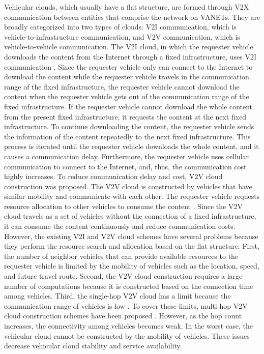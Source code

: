 \documentclass[sensors,article,accept,moreauthors,pdftex]{Definitions/mdpi}
\begin{document}
Vehicular clouds, which usually have a flat structure, are formed through V2X communication between entities that comprise the network on VANETs. They are broadly categorized into two types of clouds: V2I communication, which is vehicle-to-infrastructure communication, and V2V communication, which is vehicle-to-vehicle communication.
The V2I cloud, in which the requester vehicle downloads the content from the Internet through a fixed infrastructure, uses V2I communication \cite{Mershad2013, Lin2018, Yu2013, Abdelhamid2017, Jaiboon2017, Elahi2021, Rahman2018, Lee2019, Wang2020}. Since the requester vehicle only can connect to the Internet to download the content while the requester vehicle travels in the communication range of the fixed infrastructure, the requester vehicle cannot download the content when the requester vehicle gets out of the communication range of the fixed infrastructure. If the requester vehicle cannot download the whole content from the present fixed infrastructure, it requests the content at the next fixed infrastructure. To continue downloading the content, the requester vehicle sends the information of the content repeatedly to the next fixed infrastructure. This process is iterated until the requester vehicle downloads the whole content, and it causes a communication delay. Furthermore, the requester vehicle uses cellular communication to connect to the Internet, and, thus, the communication cost highly increases.
To reduce communication delay and cost, V2V cloud construction was proposed. The V2V cloud is constructed by vehicles that have similar mobility and communicate with each other. The requester vehicle requests resource allocation to other vehicles to consume the content \cite{Sibai2015, Meneguette2016, Meneguette2017a, Meneguette2017b, Meneguette2017c, Choi2018}. Since the V2V cloud travels as a set of vehicles without the connection of a fixed infrastructure, it can consume the content continuously and reduce communication costs.
However, the existing V2I and V2V cloud schemes have several problems because they perform the resource search and allocation based on the flat structure. First, the number of neighbor vehicles that can provide available resources to the requester vehicle is limited by the mobility of vehicles such as the location, speed, and future travel route. Second, the V2V cloud construction requires a large number of computations because it is constructed based on the connection time among vehicles. Third, the single-hop V2V cloud has a limit because the communication range of vehicles is low \cite{Sibai2015}. To cover these limits, multi-hop V2V cloud construction schemes have been proposed \cite{Meneguette2016, Meneguette2017a, Meneguette2017b, Meneguette2017c, Choi2018}. However, as the hop count increases, the connectivity among vehicles becomes weak. In the worst case, the vehicular cloud cannot be constructed by the mobility of vehicles. These issues decrease vehicular cloud stability and service availability.
\end{document}
